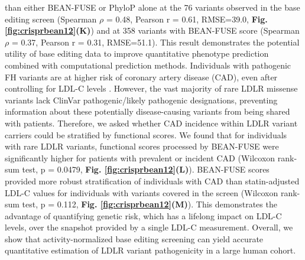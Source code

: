 \documentclass[a4paper, titlepage, openright]{book}
\begin{document}
than either BEAN-FUSE or PhyloP alone at the 76 variants observed in the base editing screen (Spearman $\rho$ = 0.48, Pearson r = 0.61, RMSE=39.0, \textbf{Fig. \ref{fig:crisprbean12}(K)}) and at 358 variants with BEAN-FUSE score (Spearman $\rho$ = 0.37, Pearson r = 0.31, RMSE=51.1). This result demonstrates the potential utility of base editing data to improve quantitative phenotype prediction combined with computational prediction methods. Individuals with pathogenic FH variants are at higher risk of coronary artery disease (CAD), even after controlling for LDL-C levels \citep{clarke2022coronary}. However, the vast majority of rare LDLR missense variants lack ClinVar pathogenic/likely pathogenic designations, preventing information about these potentially disease-causing variants from being shared with patients. Therefore, we asked whether CAD incidence within LDLR variant carriers could be stratified by functional scores. We found that for individuals with rare LDLR variants, functional scores processed by BEAN-FUSE were significantly higher for patients with prevalent or incident CAD (Wilcoxon rank-sum test, p = 0.0479, \textbf{Fig. \ref{fig:crisprbean12}(L)}). BEAN-FUSE scores provided more robust stratification of individuals with CAD than statin-adjusted LDL-C values for individuals with variants covered in the screen (Wilcoxon rank-sum test, p = 0.112, \textbf{Fig. \ref{fig:crisprbean12}(M)}). This demonstrates the advantage of quantifying genetic risk, which has a lifelong impact on LDL-C levels, over the snapshot provided by a single LDL-C measurement. Overall, we show that activity-normalized base editing screening can yield accurate quantitative estimation of LDLR variant pathogenicity in a large human cohort.
\end{document}

